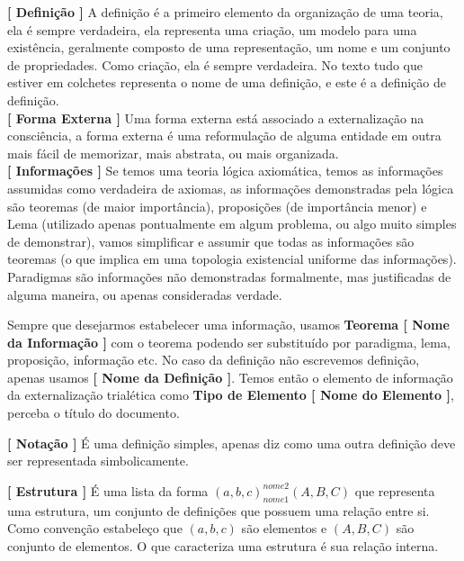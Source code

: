 \hspace{\baselineskip}

\textbf{[ Definição ]} A definição é a primeiro elemento da organização de uma teoria, ela é sempre verdadeira, ela representa uma criação, um modelo para uma existência, geralmente composto de uma representação, um nome e um conjunto de propriedades. Como criação, ela é sempre verdadeira. No texto tudo que estiver em colchetes representa o nome de uma definição, e este é a definição de definição.\\

\textbf{[ Forma Externa ]} Uma forma externa está associado a externalização na consciência, a forma externa é uma reformulação de alguma entidade em outra mais fácil de memorizar, mais abstrata, ou mais organizada. \\

\textbf{[ Informações ]} Se temos uma teoria lógica axiomática, temos as informações assumidas como verdadeira de axiomas, as informações demonstradas pela lógica são teoremas (de maior importância), proposições (de importância menor) e Lema (utilizado apenas pontualmente em algum problema, ou algo muito simples de demonstrar), vamos simplificar e assumir que todas as informações são teoremas (o que implica em uma topologia existencial uniforme das informações). Paradigmas são informações não demonstradas formalmente, mas justificadas de alguma maneira, ou apenas consideradas verdade.

\hspace{\baselineskip}

Sempre que desejarmos estabelecer uma informação, usamos \textbf{Teorema [ Nome da Informação ]} com o teorema podendo ser substituído por paradigma, lema, proposição, informação etc. No caso da definição não escrevemos definição, apenas usamos \textbf{[ Nome da Definição ]}. Temos então o elemento de informação da externalização trialética como \textbf{Tipo de Elemento [ Nome do Elemento ]}, perceba o título do documento.

\hspace{\baselineskip}

\textbf{[ Notação ]} É uma definição simples, apenas diz como uma outra definição deve ser representada simbolicamente.

\hspace{\baselineskip}

\textbf{[ Estrutura ]} É uma lista da forma $(a,b,c)_{nome1}^{nome2}(A,B,C)$ que representa uma estrutura, um conjunto de definições que possuem uma relação entre si. Como convenção estabeleço que $(a,b,c)$ são elementos e $(A,B,C)$ são conjunto de elementos. O que caracteriza uma estrutura é sua relação interna.\\


